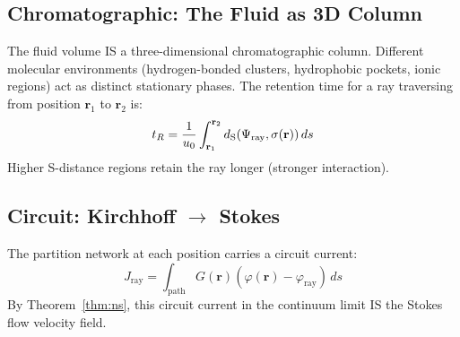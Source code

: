 \subsection{Chromatographic: The Fluid as 3D Column}

The fluid volume IS a three-dimensional chromatographic column. Different molecular environments (hydrogen-bonded clusters, hydrophobic pockets, ionic regions) act as distinct stationary phases. The retention time for a ray traversing from position $\mathbf{r}_1$ to $\mathbf{r}_2$ is:
\begin{equation}
    t_R = \frac{1}{u_0}\int_{\mathbf{r}_1}^{\mathbf{r}_2} d_{\mathrm{S}}(\Psi_{\mathrm{ray}}, \sigma(\mathbf{r}))\, ds
\end{equation}
Higher S-distance regions retain the ray longer (stronger interaction).

\subsection{Circuit: Kirchhoff $\to$ Stokes}

The partition network at each position carries a circuit current:
\begin{equation}
    J_{\mathrm{ray}} = \int_{\mathrm{path}} G(\mathbf{r})(\varphi(\mathbf{r}) - \varphi_{\mathrm{ray}})\, ds
\end{equation}
By Theorem~\ref{thm:ns}, this circuit current in the continuum limit IS the Stokes flow velocity field.

